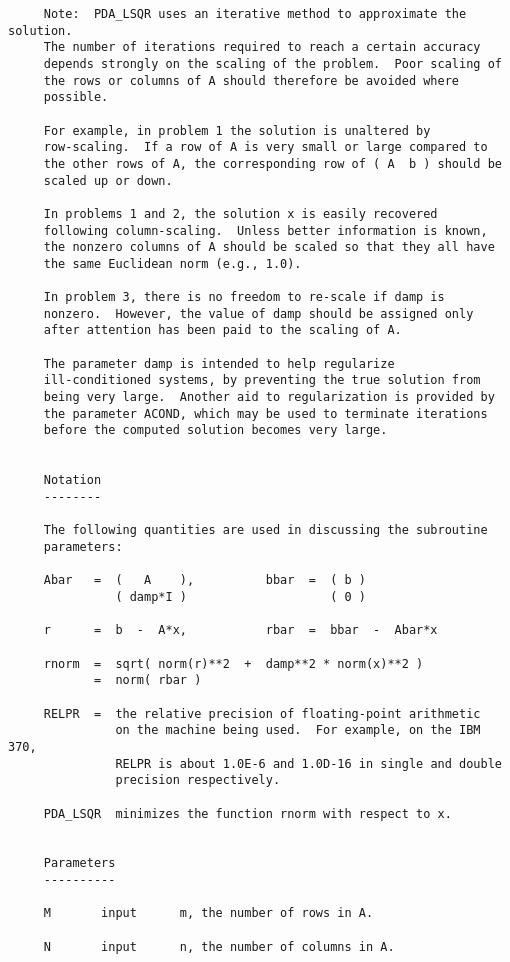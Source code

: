 \begin{verbatim}
     Note:  PDA_LSQR uses an iterative method to approximate the solution.
     The number of iterations required to reach a certain accuracy
     depends strongly on the scaling of the problem.  Poor scaling of
     the rows or columns of A should therefore be avoided where
     possible.

     For example, in problem 1 the solution is unaltered by
     row-scaling.  If a row of A is very small or large compared to
     the other rows of A, the corresponding row of ( A  b ) should be
     scaled up or down.

     In problems 1 and 2, the solution x is easily recovered
     following column-scaling.  Unless better information is known,
     the nonzero columns of A should be scaled so that they all have
     the same Euclidean norm (e.g., 1.0).

     In problem 3, there is no freedom to re-scale if damp is
     nonzero.  However, the value of damp should be assigned only
     after attention has been paid to the scaling of A.

     The parameter damp is intended to help regularize
     ill-conditioned systems, by preventing the true solution from
     being very large.  Another aid to regularization is provided by
     the parameter ACOND, which may be used to terminate iterations
     before the computed solution becomes very large.


     Notation
     --------

     The following quantities are used in discussing the subroutine
     parameters:

     Abar   =  (   A    ),          bbar  =  ( b )
               ( damp*I )                    ( 0 )

     r      =  b  -  A*x,           rbar  =  bbar  -  Abar*x

     rnorm  =  sqrt( norm(r)**2  +  damp**2 * norm(x)**2 )
            =  norm( rbar )

     RELPR  =  the relative precision of floating-point arithmetic
               on the machine being used.  For example, on the IBM 370,
               RELPR is about 1.0E-6 and 1.0D-16 in single and double
               precision respectively.

     PDA_LSQR  minimizes the function rnorm with respect to x.


     Parameters
     ----------

     M       input      m, the number of rows in A.

     N       input      n, the number of columns in A.


\end{verbatim}
